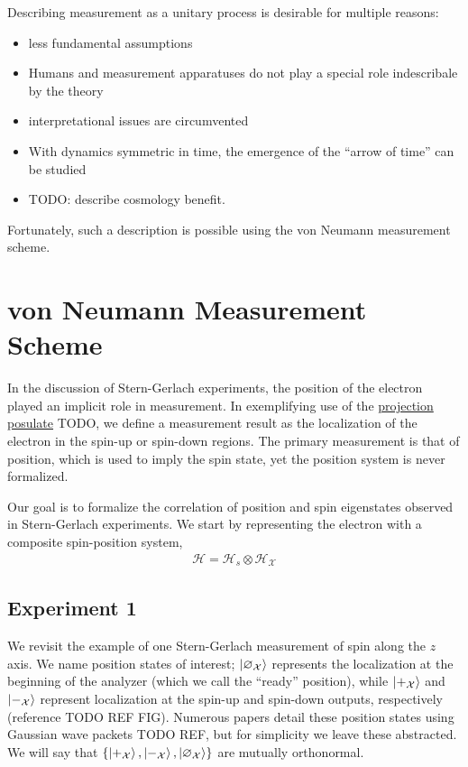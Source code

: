 Describing measurement as a unitary process is desirable for multiple reasons:
\begin{itemize}
  \item less fundamental assumptions
  \item Humans and measurement apparatuses do not play a special role indescribale by the theory
  \item interpretational issues are circumvented
  \item With dynamics symmetric in time, the emergence of the ``arrow of time'' can be studied
  \item TODO: describe cosmology benefit.
\end{itemize}

Fortunately, such a description is possible using the von Neumann measurement scheme.

\section{von Neumann Measurement Scheme}
In the discussion of Stern-Gerlach experiments, the position of the electron played an implicit role in measurement. In exemplifying use of the \hyperref[projection postulate]{projection posulate} TODO, we define a measurement result as the localization of the electron in the spin-up or spin-down regions. The primary measurement is that of position, which is used to imply the spin state, yet the position system is never formalized.

Our goal is to formalize the correlation of position and spin eigenstates observed in Stern-Gerlach experiments. We start by representing the electron with a composite spin-position system,
\begin{align}
  \mathcal{H} = \mathcal{H}_s \otimes \mathcal{H}_\mathcal{X}
\end{align}

\subsection{Experiment 1}
We revisit the example of one Stern-Gerlach measurement of spin along the $z$ axis. We name position states of interest; $\ket{\varnothing_\mathcal{X}}$ represents the localization at the beginning of the analyzer (which we call the ``ready'' position), while $\ket{+_{\mathcal{X}}}$ and $\ket{-_{\mathcal{X}}}$ represent localization at the spin-up and spin-down outputs, respectively (reference TODO REF FIG). Numerous papers detail these position states using Gaussian wave packets TODO REF, but for simplicity we leave these abstracted. We will say that $\{\ket{+_{\mathcal{X}}}, \ket{-_{\mathcal{X}}}, \ket{\varnothing_\mathcal{X}}\}$ are mutually orthonormal.

